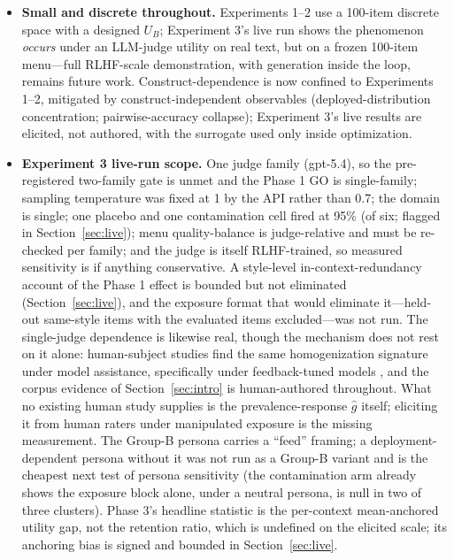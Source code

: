 ﻿\documentclass[11pt]{article}
\begin{document}
\begin{itemize}
\item \textbf{Small and discrete throughout.} Experiments 1--2 use a 100-item discrete space with a designed \(U_B\); Experiment 3's live run shows the phenomenon \emph{occurs} under an LLM-judge utility on real text, but on a frozen 100-item menu---full RLHF-scale demonstration, with generation inside the loop, remains future work. Construct-dependence is now confined to Experiments 1--2, mitigated by construct-independent observables (deployed-distribution concentration; pairwise-accuracy collapse); Experiment 3's live results are elicited, not authored, with the surrogate used only inside optimization.
\item \textbf{Experiment 3 live-run scope.} One judge family (gpt-5.4), so the pre-registered two-family gate is unmet and the Phase 1 GO is single-family; sampling temperature was fixed at 1 by the API rather than 0.7; the domain is single; one placebo and one contamination cell fired at 95\% (of six; flagged in Section~\ref{sec:live}); menu quality-balance is judge-relative and must be re-checked per family; and the judge is itself RLHF-trained, so measured sensitivity is if anything conservative. A style-level in-context-redundancy account of the Phase 1 effect is bounded but not eliminated (Section~\ref{sec:live}), and the exposure format that would eliminate it---held-out same-style items with the evaluated items excluded---was not run. The single-judge dependence is likewise real, though the mechanism does not rest on it alone: human-subject studies find the same homogenization signature under model assistance, specifically under feedback-tuned models \citep{doshi2024, padmakumar2024}, and the corpus evidence of Section~\ref{sec:intro} is human-authored throughout. What no existing human study supplies is the prevalence-response \(\hat g\) itself; eliciting it from human raters under manipulated exposure is the missing measurement. The Group-B persona carries a ``feed'' framing; a deployment-dependent persona without it was not run as a Group-B variant and is the cheapest next test of persona sensitivity (the contamination arm already shows the exposure block alone, under a neutral persona, is null in two of three clusters). Phase 3's headline statistic is the per-context mean-anchored utility gap, not the retention ratio, which is undefined on the elicited scale; its anchoring bias is signed and bounded in Section~\ref{sec:live}.

\end{itemize}
\end{document}
